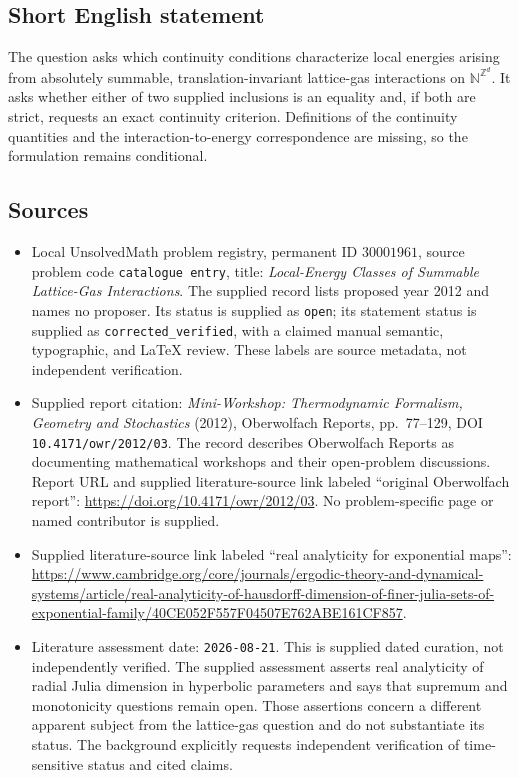 \documentclass[11pt]{article}
\begin{document}
\subsection{Short English statement}
The question asks which continuity conditions characterize local energies arising from absolutely summable, translation-invariant lattice-gas interactions on \(\mathbb{N}^{\mathbb{Z}^d}\). It asks whether either of two supplied inclusions is an equality and, if both are strict, requests an exact continuity criterion. Definitions of the continuity quantities and the interaction-to-energy correspondence are missing, so the formulation remains conditional.
\subsection{Sources}
\begin{itemize}
\item Local UnsolvedMath problem registry, permanent ID \(30001961\), source problem code \texttt{catalogue entry}, title: \emph{Local-Energy Classes of Summable Lattice-Gas Interactions}. The supplied record lists proposed year 2012 and names no proposer. Its status is supplied as \texttt{open}; its statement status is supplied as \texttt{corrected\_verified}, with a claimed manual semantic, typographic, and LaTeX review. These labels are source metadata, not independent verification.
\item Supplied report citation: \emph{Mini-Workshop: Thermodynamic Formalism, Geometry and Stochastics} (2012), Oberwolfach Reports, pp.~77--129, DOI \texttt{10.4171/owr/2012/03}. The record describes Oberwolfach Reports as documenting mathematical workshops and their open-problem discussions. Report URL and supplied literature-source link labeled ``original Oberwolfach report'': \url{https://doi.org/10.4171/owr/2012/03}. No problem-specific page or named contributor is supplied.
\item Supplied literature-source link labeled ``real analyticity for exponential maps'': \url{https://www.cambridge.org/core/journals/ergodic-theory-and-dynamical-systems/article/real-analyticity-of-hausdorff-dimension-of-finer-julia-sets-of-exponential-family/40CE052F557F04507E762ABE161CF857}.
\item Literature assessment date: \texttt{2026-08-21}. This is supplied dated curation, not independently verified. The supplied assessment asserts real analyticity of radial Julia dimension in hyperbolic parameters and says that supremum and monotonicity questions remain open. Those assertions concern a different apparent subject from the lattice-gas question and do not substantiate its status. The background explicitly requests independent verification of time-sensitive status and cited claims.
\end{itemize}
\end{document}
